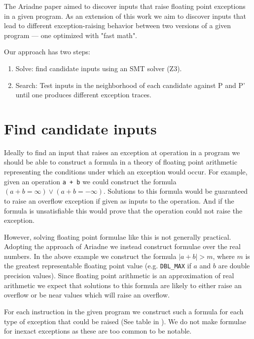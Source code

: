 \usepackage{listings}
\usepackage[style=numeric]{biblatex}


The Ariadne paper aimed to discover inputs that raise floating point
exceptions in a given program. As an extension of this work we aim to discover
inputs that lead to different exception-raising behavior between two versions
of a given program — one optimized with "fast math".

Our approach has two steps:
\begin{enumerate}
  \item Solve: find candidate inputs using an SMT solver (Z3).
  \item Search: Test inputs in the neighborhood of each candidate against P and
P' until one produces different exception traces.
\end{enumerate}

\section{Find candidate inputs}

Ideally to find an input that raises an exception at operation in a program we
should be able to construct a formula in a theory of floating point arithmetic
representing the conditions under which an exception would occur. For example,
given an operation \texttt{a + b} we could construct the formula $(a + b =
\infty) \lor (a + b = -\infty)$. Solutions to this formula would be guaranteed
to raise an overflow exception if given as inputs to the operation. And if the
formula is unsatisfiable this would prove that the operation could not raise the
exception.

However, solving floating point formulae like this is not generally practical.
Adopting the approach of Ariadne we instead construct formulae over the real
numbers. In the above example we construct the formula $|a + b| > m$, where $m$
is the greatest representable floating point value (e.g. \texttt{DBL_MAX} if $a$
and $b$ are double precision values). Since floating point arithmetic is an
approximation of real arithmetic we expect that solutions to this formula are
likely to either raise an overflow or be near values which will raise an
overflow.

For each instruction in the given program we construct such a formula for each
type of exception that could be raised (See table in \cite[page
4]{barr_automatic_2013}). We do not make formulae for inexact exceptions as
these are too common to be notable.

